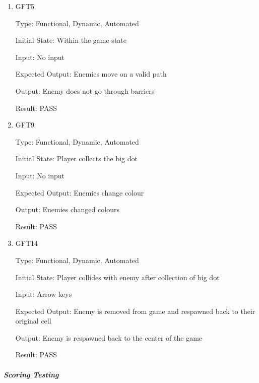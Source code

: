 \documentclass[12pt, titlepage]{article}
\begin{document}
\begin{enumerate}

\item{GFT5\\}

Type: Functional, Dynamic, Automated
					
Initial State: Within the game state
					
Input: No input
					
Expected Output: Enemies move on a valid path

Output: Enemy does not go through barriers

Result: PASS

\item{GFT9\\}

Type: Functional, Dynamic, Automated
					
Initial State: Player collects the big dot
					
Input: No input
					
Expected Output: Enemies change colour

Output: Enemies changed colours

Result: PASS

\item{GFT14\\}

Type: Functional, Dynamic, Automated
					
Initial State: Player collides with enemy after collection of big dot
					
Input: Arrow keys
					
Expected Output: Enemy is removed from game and respawned back to their original cell

Output: Enemy is respawned back to the center of the game

Result: PASS

\end{enumerate}

\subparagraph{Scoring Testing}
\end{document}

